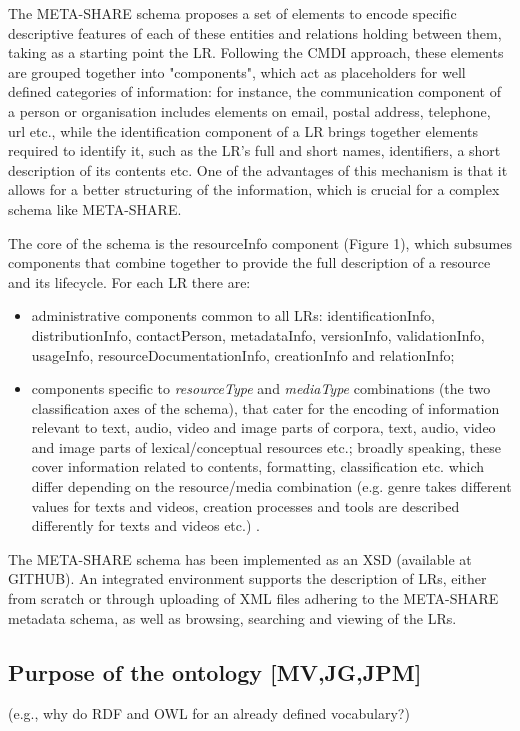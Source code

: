 \documentclass{llncs}
\begin{document}
The META-SHARE schema proposes a set of elements to encode specific descriptive features of each of these entities and relations holding between them, taking as a starting point the LR. Following the CMDI approach, these elements are grouped together into "components", which act as placeholders for well defined categories of information: for instance, the communication component of a person or organisation includes elements on email, postal address, telephone, url etc., while the identification component of a LR brings together elements required to identify it, such as the LR's full and short names, identifiers, a short description of its contents etc. One of the advantages of this mechanism is that it allows for a better structuring of the information, which is crucial for a complex schema like META-SHARE.

The core of the schema is the resourceInfo component (Figure 1), which subsumes components that combine together to provide the full description of a resource and its lifecycle. For each LR there are:
\begin{itemize}
\item administrative components common to all LRs: identificationInfo, distributionInfo, contactPerson, metadataInfo, versionInfo, validationInfo, usageInfo, resourceDocumentationInfo, creationInfo and relationInfo;
\item components specific to {\it resourceType} and {\it mediaType} combinations (the two classification axes of the schema), that cater for the encoding of information relevant to text, audio, video and image parts of corpora, text, audio, video and image parts of lexical/conceptual resources etc.; broadly speaking, these cover information related to contents, formatting, classification etc. which differ depending on the resource/media combination (e.g. genre takes different values for texts and videos, creation processes and tools are described differently for texts and videos etc.) .
\end{itemize}

The META-SHARE schema has been implemented as an XSD (available at {\hi GITHUB}).  An integrated environment supports the description of LRs, either from scratch or through uploading of XML files adhering to the META-SHARE metadata schema, as well as browsing, searching and viewing of the LRs.


\subsection{Purpose of the ontology [MV,JG,JPM]}
\label{sec:purpose}
(e.g., why do RDF and OWL for an already defined vocabulary?) 
\end{document}
